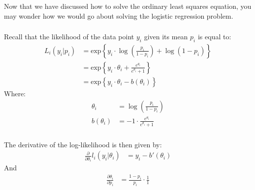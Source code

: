 \begin{frame}[fragile] \frametitle{}

Now that we have discussed how to solve the ordinary least squares
equation, you may wonder how we would go about solving the logistic
regression problem.

\end{frame}

\begin{frame}[fragile] \frametitle{}

Recall that the likelihood of the data point $y_i$ given its
mean $p_i$ is equal to:
\begin{align*}
L_i(y_i | p_i)
&= \text{exp} \left\{y_i \cdot \log\left(\frac{p_i}{1-p_i}\right) + \log(1 - p_i) \right\} \\
&= \text{exp} \left\{y_i \cdot \theta_i + \frac{e^{\theta_i}}{e^{\theta_i} + 1}\right\} \\
&= \text{exp} \left\{y_i \cdot \theta_i - b(\theta_i) \right\}
\end{align*}
Where:
\begin{align*}
\theta_i &= \log\left(\frac{p_i}{1-p_i}\right) \\
b(\theta_i) &= -1 \cdot \frac{e^{\theta_i}}{e^{\theta_i} + 1}
\end{align*}

\end{frame}

\begin{frame}[fragile] \frametitle{}

The derivative of the log-likelihood is then given by:
\begin{align*}
\frac{\partial}{\partial \theta_i}  l_i(y_i | \theta_i)
&= y_i - b'(\theta_i)
\end{align*}
And
\begin{align*}
\frac{\partial \theta_i}{\partial p_i} &=
  \frac{1-p_i}{p_i} \cdot \frac{1}{1}
\end{align*}

\end{frame}

